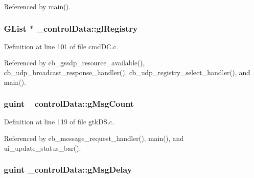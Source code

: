 Referenced by main().

\subsubsection[{\texorpdfstring{gl\+Registry}{glRegistry}}]{\setlength{\rightskip}{0pt plus 5cm}G\+List $\ast$ \+\_\+control\+Data\+::gl\+Registry}\hypertarget{struct__control_data_a34b1729bc0b37c9dce0327ea4cd8a812}{}\label{struct__control_data_a34b1729bc0b37c9dce0327ea4cd8a812}


Definition at line 101 of file cmd\+D\+C.\+c.



Referenced by cb\+\_\+gssdp\+\_\+resource\+\_\+available(), cb\+\_\+udp\+\_\+broadcast\+\_\+response\+\_\+handler(), cb\+\_\+udp\+\_\+registry\+\_\+select\+\_\+handler(), and main().

\subsubsection[{\texorpdfstring{g\+Msg\+Count}{gMsgCount}}]{\setlength{\rightskip}{0pt plus 5cm}guint \+\_\+control\+Data\+::g\+Msg\+Count}\hypertarget{struct__control_data_ae797898f8e5ad5c3128da674f86520d1}{}\label{struct__control_data_ae797898f8e5ad5c3128da674f86520d1}


Definition at line 119 of file gtk\+D\+S.\+c.



Referenced by cb\+\_\+message\+\_\+request\+\_\+handler(), main(), and ui\+\_\+update\+\_\+status\+\_\+bar().

\subsubsection[{\texorpdfstring{g\+Msg\+Delay}{gMsgDelay}}]{\setlength{\rightskip}{0pt plus 5cm}guint \+\_\+control\+Data\+::g\+Msg\+Delay}\hypertarget{struct__control_data_a277ea878a8491fa38269b6c762a05389}{}\label{struct__control_data_a277ea878a8491fa38269b6c762a05389}


